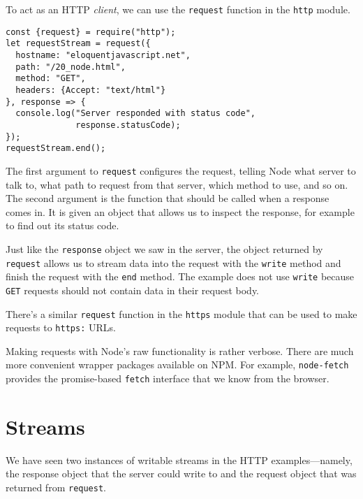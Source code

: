 To act as an HTTP \emph{client}, we can use the \lstinline`request` function in the \lstinline`http` module.

\begin{lstlisting}
const {request} = require("http");
let requestStream = request({
  hostname: "eloquentjavascript.net",
  path: "/20_node.html",
  method: "GET",
  headers: {Accept: "text/html"}
}, response => {
  console.log("Server responded with status code",
              response.statusCode);
});
requestStream.end();
\end{lstlisting}
\noindent{}

The first argument to \lstinline`request` configures the request, telling Node what server to talk to, what path to request from that server, which method to use, and so on. The second argument is the function that should be called when a response comes in. It is given an object that allows us to inspect the response, for example to find out its status code.

Just like the \lstinline`response` object we saw in the server, the object returned by \lstinline`request` allows us to stream data into the request with the \lstinline`write` method and finish the request with the \lstinline`end` method. The example does not use \lstinline`write` because \lstinline`GET` requests should not contain data in their request body.

There's a similar \lstinline`request` function in the \lstinline`https` module that can be used to make requests to \lstinline`https:` URLs.

Making requests with Node's raw functionality is rather verbose. There are much more convenient wrapper packages available on NPM. For example, \lstinline`node-fetch` provides the promise-based \lstinline`fetch` interface that we know from the browser.

\section{Streams}

We have seen two instances of writable streams in the HTTP examples—namely, the response object that the server could write to and the request object that was returned from \lstinline`request`.

